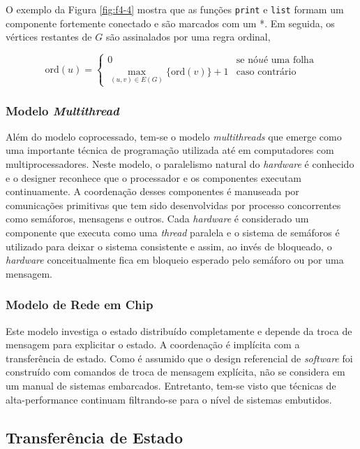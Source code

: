 O exemplo da Figura \ref{fig:f4-4} mostra que as funções \texttt{print} e \texttt{list} formam um componente fortemente conectado e são marcados com um *. Em seguida, os vértices restantes de $ G $ são assinalados por uma regra ordinal,

$$
\text{ord}(u) = 
\left\{\begin{matrix}
0 & \text{se nó} u \text{é uma folha} \\ 
\underset{(u,v) \in E(G)}{\max} \{ \text{ord}(v) \} + 1 & \text{caso contrário}
\end{matrix}\right.
$$



\subsubsection{Modelo \textit{Multithread}}

Além do modelo coprocessado, tem-se o modelo \textit{multithreads} que emerge como uma importante técnica de programação utilizada até em computadores com multiprocessadores. Neste modelo, o paralelismo natural do \textit{hardware} é conhecido e o designer reconhece que o processador e os componentes executam continuamente. A coordenação desses componentes é manuseada por comunicações primitivas que tem sido desenvolvidas por processo concorrentes como semáforos, mensagens e outros. Cada \textit{hardware} é considerado um componente que executa como uma \textit{thread} paralela e o sistema de semáforos é utilizado para deixar o sistema consistente e assim, ao invés de bloqueado, o \textit{hardware} conceitualmente fica em bloqueio esperado pelo semáforo ou por uma mensagem.



\subsubsection{Modelo de Rede em Chip}

Este modelo investiga o estado distribuído completamente e depende da troca de mensagem para explicitar o estado. A coordenação é implícita com a transferência de estado. Como é assumido que o design referencial de \textit{software} foi construído com comandos de troca de mensagem explícita, não se considera em um manual de sistemas embarcados. Entretanto, tem-se visto que técnicas de alta-performance continuam filtrando-se para o nível de sistemas embutidos.



\subsection{Transferência de Estado}

